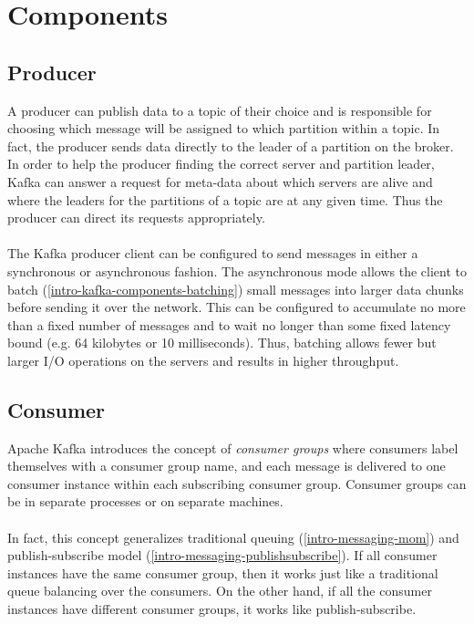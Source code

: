\section{Components}

\subsection{Producer}

A producer can publish data to a topic of their choice and is responsible for
choosing which message will be assigned to which partition within a topic. In
fact, the producer sends data directly to the leader of a partition on the
broker. In order to help the producer finding the correct server and partition
leader, Kafka can answer a request for meta-data about which servers are alive
and where the leaders for the partitions of a topic are at any given time. Thus
the producer can direct its requests appropriately. \cite{apachekafka}
\\ \\
The Kafka producer client can be configured to send messages in either a
synchronous or asynchronous fashion. The asynchronous mode allows the client to
batch (\ref{intro-kafka-components-batching}) small messages into larger data
chunks before sending it over the network. This can be configured to accumulate
no more than a fixed number of messages and to wait no longer than some fixed
latency bound (e.g. 64 kilobytes or 10 milliseconds). Thus, batching allows
fewer but larger I/O operations on the servers and results in higher throughput.
\cite{apachekafka} \cite{goodhope2012building}

\subsection{Consumer}

Apache Kafka introduces the concept of \textit{consumer groups} where consumers
label themselves with a consumer group name, and each message is delivered to
one consumer instance within each subscribing consumer group. Consumer groups
can be in separate processes or on separate machines.
\\ \\
In fact, this concept generalizes traditional queuing (\ref{intro-messaging-mom})
and publish-subscribe model (\ref{intro-messaging-publishsubscribe}).
If all consumer instances have the same consumer
group, then it works just like a traditional queue balancing over the consumers.
On the other hand, if all the consumer instances have different consumer groups,
it works like publish-subscribe.

